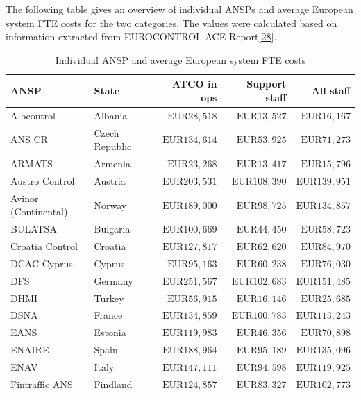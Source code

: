 \documentclass[
  11pt,
  a4paper,
]{book}
\begin{document}
The following table gives an overview of individual ANSPs and average
European system FTE costs for the two categories. The values were
calculated based on information extracted from EUROCONTROL ACE
Report\protect\hyperlink{ref-ace2020}{{[}28{]}}.

\hypertarget{tbl-ansp-employment-cost-detailed}{}
\begin{longtable}{llrrr}
\caption{\label{tbl-ansp-employment-cost-detailed}Individual ANSP and average European system FTE costs }\tabularnewline

\toprule
ANSP & State & ATCO in ops & Support staff & All staff \\ 
\midrule
Albcontrol & Albania & $\text{EUR}28,518$ & $\text{EUR}13,527$ & $\text{EUR}16,167$ \\ 
ANS CR & Czech Republic & $\text{EUR}134,614$ & $\text{EUR}53,925$ & $\text{EUR}71,273$ \\ 
ARMATS & Armenia & $\text{EUR}23,268$ & $\text{EUR}13,417$ & $\text{EUR}15,796$ \\ 
Austro Control & Austria & $\text{EUR}203,531$ & $\text{EUR}108,390$ & $\text{EUR}139,951$ \\ 
Avinor (Continental) & Norway & $\text{EUR}189,000$ & $\text{EUR}98,725$ & $\text{EUR}134,857$ \\ 
BULATSA & Bulgaria & $\text{EUR}100,669$ & $\text{EUR}44,450$ & $\text{EUR}58,723$ \\ 
Croatia Control & Croatia & $\text{EUR}127,817$ & $\text{EUR}62,620$ & $\text{EUR}84,970$ \\ 
DCAC Cyprus & Cyprus & $\text{EUR}95,163$ & $\text{EUR}60,238$ & $\text{EUR}76,030$ \\ 
DFS & Germany & $\text{EUR}251,567$ & $\text{EUR}102,683$ & $\text{EUR}151,485$ \\ 
DHMI & Turkey & $\text{EUR}56,915$ & $\text{EUR}16,146$ & $\text{EUR}25,685$ \\ 
DSNA & France & $\text{EUR}134,859$ & $\text{EUR}100,783$ & $\text{EUR}113,243$ \\ 
EANS & Estonia & $\text{EUR}119,983$ & $\text{EUR}46,356$ & $\text{EUR}70,898$ \\ 
ENAIRE & Spain & $\text{EUR}188,964$ & $\text{EUR}95,189$ & $\text{EUR}135,096$ \\ 
ENAV & Italy & $\text{EUR}147,111$ & $\text{EUR}94,598$ & $\text{EUR}119,925$ \\ 
Fintraffic ANS & Findland & $\text{EUR}124,857$ & $\text{EUR}83,327$ & $\text{EUR}102,773$ \\ 

\end{longtable}
\end{document}
